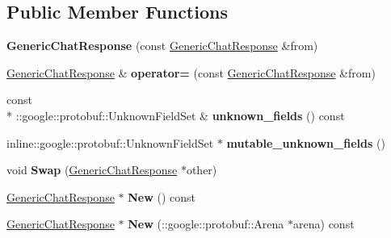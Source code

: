 \subsection*{Public Member Functions}
\begin{DoxyCompactItemize}
\item 
\hypertarget{classSimpleChat_1_1GenericChatResponse_a8c213083a5187cc88248f73f4b9caa32}{{\bfseries Generic\-Chat\-Response} (const \hyperlink{classSimpleChat_1_1GenericChatResponse}{Generic\-Chat\-Response} \&from)}\label{classSimpleChat_1_1GenericChatResponse_a8c213083a5187cc88248f73f4b9caa32}

\item 
\hypertarget{classSimpleChat_1_1GenericChatResponse_ab7b303384a8be058542514257b823e7a}{\hyperlink{classSimpleChat_1_1GenericChatResponse}{Generic\-Chat\-Response} \& {\bfseries operator=} (const \hyperlink{classSimpleChat_1_1GenericChatResponse}{Generic\-Chat\-Response} \&from)}\label{classSimpleChat_1_1GenericChatResponse_ab7b303384a8be058542514257b823e7a}

\item 
\hypertarget{classSimpleChat_1_1GenericChatResponse_a6b96bcbb3707721c86be7cd8f0141257}{const \\*
\-::google\-::protobuf\-::\-Unknown\-Field\-Set \& {\bfseries unknown\-\_\-fields} () const }\label{classSimpleChat_1_1GenericChatResponse_a6b96bcbb3707721c86be7cd8f0141257}

\item 
\hypertarget{classSimpleChat_1_1GenericChatResponse_ae9b3f178e2c1977419b592d6e34514fb}{inline\-::google\-::protobuf\-::\-Unknown\-Field\-Set $\ast$ {\bfseries mutable\-\_\-unknown\-\_\-fields} ()}\label{classSimpleChat_1_1GenericChatResponse_ae9b3f178e2c1977419b592d6e34514fb}

\item 
\hypertarget{classSimpleChat_1_1GenericChatResponse_aa5291bf3846f40f0b31b3ed7067e2830}{void {\bfseries Swap} (\hyperlink{classSimpleChat_1_1GenericChatResponse}{Generic\-Chat\-Response} $\ast$other)}\label{classSimpleChat_1_1GenericChatResponse_aa5291bf3846f40f0b31b3ed7067e2830}

\item 
\hypertarget{classSimpleChat_1_1GenericChatResponse_a1a738fd772bbba861c3ba4647d80e71f}{\hyperlink{classSimpleChat_1_1GenericChatResponse}{Generic\-Chat\-Response} $\ast$ {\bfseries New} () const }\label{classSimpleChat_1_1GenericChatResponse_a1a738fd772bbba861c3ba4647d80e71f}

\item 
\hypertarget{classSimpleChat_1_1GenericChatResponse_a02271f6d048eb69dd91bcab14f9139b5}{\hyperlink{classSimpleChat_1_1GenericChatResponse}{Generic\-Chat\-Response} $\ast$ {\bfseries New} (\-::google\-::protobuf\-::\-Arena $\ast$arena) const }\label{classSimpleChat_1_1GenericChatResponse_a02271f6d048eb69dd91bcab14f9139b5}


\end{DoxyCompactItemize}
